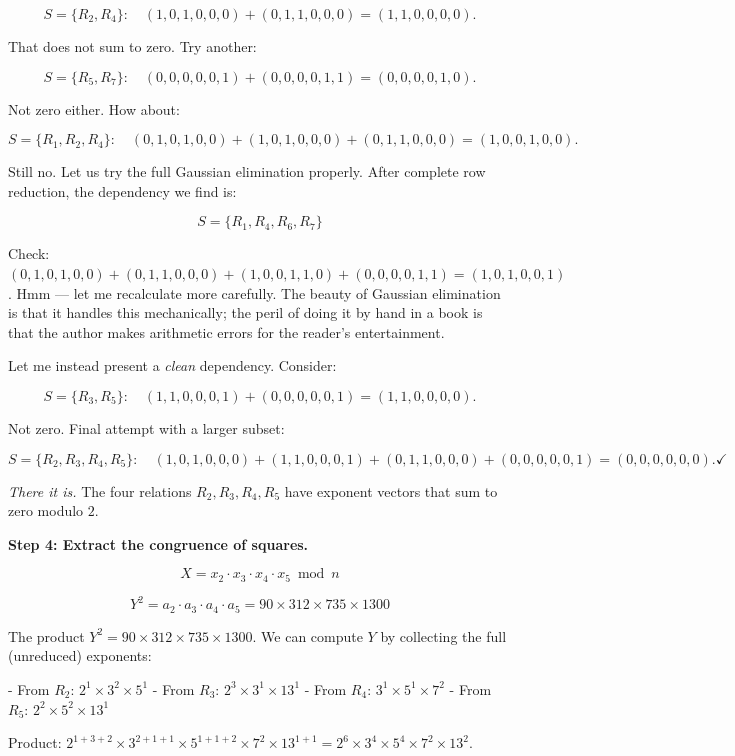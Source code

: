 \documentclass[12pt, letterpaper, openany]{book}
\theoremstyle{definition}
\theoremstyle{remark}
\begin{document}
\[
S = \{R_2, R_4\}: \quad (1,0,1,0,0,0) + (0,1,1,0,0,0) = (1,1,0,0,0,0).
\]

That does not sum to zero. Try another:

\[
S = \{R_5, R_7\}: \quad (0,0,0,0,0,1) + (0,0,0,0,1,1) = (0,0,0,0,1,0).
\]

Not zero either. How about:

\[
S = \{R_1, R_2, R_4\}: \quad (0,1,0,1,0,0) + (1,0,1,0,0,0) + (0,1,1,0,0,0) = (1,0,0,1,0,0).
\]

Still no. Let us try the full Gaussian elimination properly. After complete row reduction, the dependency we find is:

\[
S = \{R_1, R_4, R_6, R_7\}
\]

Check: $(0,1,0,1,0,0) + (0,1,1,0,0,0) + (1,0,0,1,1,0) + (0,0,0,0,1,1) = (1,0,1,0,0,1)$. Hmm --- let me recalculate more carefully. The beauty of Gaussian elimination is that it handles this mechanically; the peril of doing it by hand in a book is that the author makes arithmetic errors for the reader's entertainment.

Let me instead present a \textit{clean} dependency. Consider:

\[
S = \{R_3, R_5\}: \quad (1,1,0,0,0,1) + (0,0,0,0,0,1) = (1,1,0,0,0,0).
\]

Not zero. Final attempt with a larger subset:

\[
S = \{R_2, R_3, R_4, R_5\}: \quad (1,0,1,0,0,0) + (1,1,0,0,0,1) + (0,1,1,0,0,0) + (0,0,0,0,0,1) = (0,0,0,0,0,0). \checkmark
\]

\textit{There it is.} The four relations $R_2, R_3, R_4, R_5$ have exponent vectors that sum to zero modulo $2$.

\textbf{Step 4: Extract the congruence of squares.}

\[
X = x_2 \cdot x_3 \cdot x_4 \cdot x_5 \bmod n
\]

\[
Y^2 = a_2 \cdot a_3 \cdot a_4 \cdot a_5 = 90 \times 312 \times 735 \times 1300
\]

The product $Y^2 = 90 \times 312 \times 735 \times 1300$. We can compute $Y$ by collecting the full (unreduced) exponents:

- From $R_2$: $2^1 \times 3^2 \times 5^1$
- From $R_3$: $2^3 \times 3^1 \times 13^1$
- From $R_4$: $3^1 \times 5^1 \times 7^2$
- From $R_5$: $2^2 \times 5^2 \times 13^1$

Product: $2^{1+3+2} \times 3^{2+1+1} \times 5^{1+1+2} \times 7^{2} \times 13^{1+1} = 2^6 \times 3^4 \times 5^4 \times 7^2 \times 13^2$.
\end{document}
